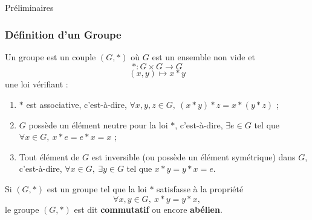 \documentclass[9pt]{beamer}
\begin{document}
		\begin{frame}{Préliminaires}
		  \frametitle{Définition d'un Groupe}
		
		\begin{definition} 
Un groupe est un couple  $(G, *)$ où $G$ est un ensemble non vide et  
			\[
			* : G \times G \longrightarrow G
			\]
			\[
			(x, y) \longmapsto x * y
			\]
une loi vérifiant :
			\begin{enumerate} [label=\roman*)]
				\item $*$ est associative, c'est-à-dire, $\forall x, y, z \in G, \ (x * y) * z = x * (y * z)$ ;
				\item $G$ possède un élément neutre pour la loi $*$, c'est-à-dire, $\exists e \in G$ tel que $\forall x \in G, \ x * e = e * x = x$ ;
				\item Tout élément de $G$ est inversible (ou possède un élément symétrique) dans $G$, c'est-à-dire, $\forall x \in G, \ \exists y \in G$ tel que $x * y = y * x = e$.
			\end{enumerate}
		\end{definition}
		
		\begin{definition} 
			Si \((G, \ast)\) est un groupe tel que la loi \(\ast\) satisfasse à la propriété
			\[
			\forall x, y \in G, \ x \ast y = y \ast x,
			\]
			le groupe \((G, \ast)\) est dit \textbf{commutatif} ou encore \textbf{abélien}.
		\end{definition}
		
			
	\end{frame}
	
	
	
\end{document}
